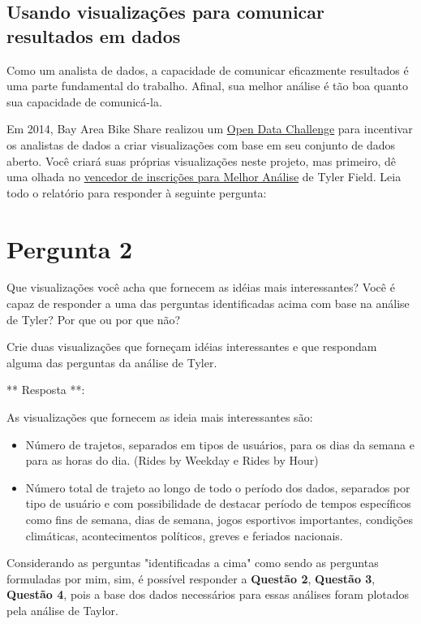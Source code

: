 \documentclass[11pt]{article}
\begin{document}
    \subsection{Usando visualizações para comunicar resultados em
dados}\label{usando-visualizauxe7uxf5es-para-comunicar-resultados-em-dados}

Como um analista de dados, a capacidade de comunicar eficazmente
resultados é uma parte fundamental do trabalho. Afinal, sua melhor
análise é tão boa quanto sua capacidade de comunicá-la.

Em 2014, Bay Area Bike Share realizou um
\href{http://www.bayareabikeshare.com/datachallenge-2014}{Open Data
Challenge} para incentivar os analistas de dados a criar visualizações
com base em seu conjunto de dados aberto. Você criará suas próprias
visualizações neste projeto, mas primeiro, dê uma olhada no
\href{http://thfield.github.io/babs/index.html}{vencedor de inscrições
para Melhor Análise} de Tyler Field. Leia todo o relatório para
responder à seguinte pergunta:

    \section{Pergunta 2}\label{pergunta-2}

Que visualizações você acha que fornecem as idéias mais interessantes?
Você é capaz de responder a uma das perguntas identificadas acima com
base na análise de Tyler? Por que ou por que não?

Crie duas visualizações que forneçam idéias interessantes e que
respondam alguma das perguntas da análise de Tyler.

    ** Resposta **:

As visualizações que fornecem as ideia mais interessantes são:

\begin{itemize}
\item
  Número de trajetos, separados em tipos de usuários, para os dias da
  semana e para as horas do dia. (Rides by Weekday e Rides by Hour)
\item
  Número total de trajeto ao longo de todo o período dos dados,
  separados por tipo de usuário e com possibilidade de destacar período
  de tempos específicos como fins de semana, dias de semana, jogos
  esportivos importantes, condições climáticas, acontecimentos
  políticos, greves e feriados nacionais.
\end{itemize}

Considerando as perguntas "identificadas a cima" como sendo as perguntas
formuladas por mim, sim, é possível responder a \textbf{Questão 2},
\textbf{Questão 3}, \textbf{Questão 4}, pois a base dos dados
necessários para essas análises foram plotados pela análise de Taylor.
\end{document}
